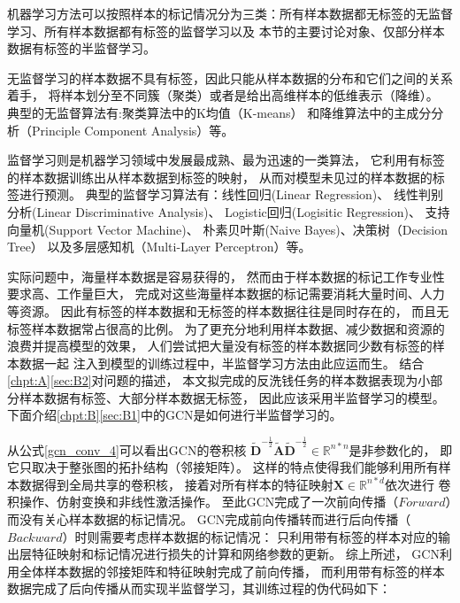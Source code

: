   机器学习方法可以按照样本的标记情况分为三类：所有样本数据都无标签的无监督学习、所有样本数据都有标签的监督学习以及
  本节的主要讨论对象、仅部分样本数据有标签的半监督学习。

  无监督学习的样本数据不具有标签，因此只能从样本数据的分布和它们之间的关系着手，
  将样本划分至不同簇（聚类）或者是给出高维样本的低维表示（降维）。
  典型的无监督算法有:聚类算法中的K均值（K-means）
  和降维算法中的主成分分析（Principle Component Analysis）等。

  监督学习则是机器学习领域中发展最成熟、最为迅速的一类算法，
  它利用有标签的样本数据训练出从样本数据到标签的映射，
  从而对模型未见过的样本数据的标签进行预测。
  典型的监督学习算法有：线性回归(Linear Regression)、
  线性判别分析(Linear Discriminative Analysis)、
  Logistic回归(Logisitic Regression)、
  支持向量机(Support Vector Machine)、
  朴素贝叶斯(Naive Bayes)、决策树（Decision Tree）
  以及多层感知机（Multi-Layer Perceptron）等。

  实际问题中，海量样本数据是容易获得的，
  然而由于样本数据的标记工作专业性要求高、工作量巨大，
  完成对这些海量样本数据的标记需要消耗大量时间、人力等资源。
  因此有标签的样本数据和无标签的样本数据往往是同时存在的，
  而且无标签样本数据常占很高的比例。
  为了更充分地利用样本数据、减少数据和资源的浪费并提高模型的效果，
  人们尝试把大量没有标签的样本数据同少数有标签的样本数据一起
  注入到模型的训练过程中，半监督学习方法由此应运而生。
  结合\ref{chpt:A}\ref{sec:B2}对问题的描述，
  本文拟完成的反洗钱任务的样本数据表现为小部分样本数据有标签、大部分样本数据无标签，
  因此应该采用半监督学习的模型。
  下面介绍\ref{chpt:B}\ref{sec:B1}中的GCN是如何进行半监督学习的。

  从公式\ref{gcn_conv_4}可以看出GCN的卷积核
  $\tilde{\mathbf{D}}^{-\frac{1}{2}} \tilde{\mathbf{A}} \tilde{\mathbf{D}}^{-\frac{1}{2}} \in \mathbb{R}^{n*n}$是非参数化的，
  即它只取决于整张图的拓扑结构（邻接矩阵）。
  这样的特点使得我们能够利用所有样本数据得到全局共享的卷积核，
  接着对所有样本的特征映射$\mathbf{X} \in \mathbb{R}^{n*d}$依次进行
  卷积操作、仿射变换和非线性激活操作。
  至此GCN完成了一次前向传播（$Forward$）而没有关心样本数据的标记情况。
  GCN完成前向传播转而进行后向传播（$Backward$）时则需要考虑样本数据的标记情况：
  只利用带有标签的样本对应的输出层特征映射和标记情况进行损失的计算和网络参数的更新。
  \newpage
  综上所述，
  GCN利用全体样本数据的邻接矩阵和特征映射完成了前向传播，
  而利用带有标签的样本数据完成了后向传播从而实现半监督学习，其训练过程的伪代码如下：

